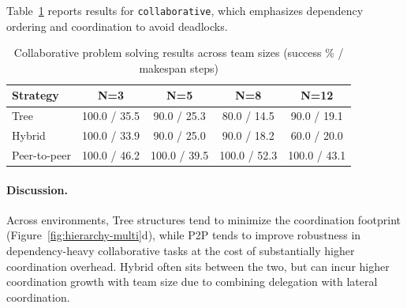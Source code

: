 Table~\ref{tab:hierarchy-collaborative} reports results for \texttt{collaborative}, which emphasizes dependency ordering and coordination to avoid deadlocks.

\begin{table}[H]
\centering
\caption{Collaborative problem solving results across team sizes (success \% / makespan steps)}
\label{tab:hierarchy-collaborative}
\begin{tabular}{l|c|c|c|c}
\toprule
\textbf{Strategy} & \textbf{N=3} & \textbf{N=5} & \textbf{N=8} & \textbf{N=12} \\
\midrule
Tree         & 100.0 / 35.5 & 90.0 / 25.3 & 80.0 / 14.5 & 90.0 / 19.1 \\
Hybrid       & 100.0 / 33.9 & 90.0 / 25.0 & 90.0 / 18.2 & 60.0 / 20.0 \\
Peer-to-peer & 100.0 / 46.2 & 100.0 / 39.5 & 100.0 / 52.3 & 100.0 / 43.1 \\
\bottomrule
\end{tabular}
\end{table}

\paragraph{Discussion.}
Across environments, Tree structures tend to minimize the coordination footprint (Figure~\ref{fig:hierarchy-multi}d), while P2P tends to improve robustness in dependency-heavy collaborative tasks at the cost of substantially higher coordination overhead. Hybrid often sits between the two, but can incur higher coordination growth with team size due to combining delegation with lateral coordination.


